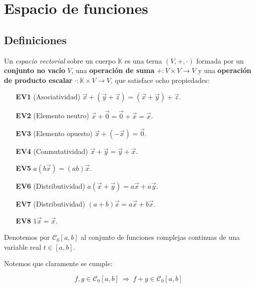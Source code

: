 \chapter{Espacio de funciones}

\section{Definiciones}

\begin{defi}
    Un \emph{espacio vectorial} sobre un cuerpo $\mathbb{K}$ es una terna $(V, +, \cdot)$ formada por un \textbf{conjunto no vacío} $V$, una \textbf{operación de suma} $+: V \times V \to V$ y una \textbf{operación de producto escalar} $\cdot: \mathbb{K} \times V \to V$, que satisface ocho propiedades: 

    \begin{multicols}{2}   
        \begin{itemize}
            \item[\textbf{EV1}] (Asociatividad) $\vec{x} + (\vec{y} + \vec{z}) = (\vec{x} + \vec{y}) + \vec{z}$. 
            \item[\textbf{EV2}] (Elemento neutro) $\vec{x} + \vec{0} = \vec{0} + \vec{x} = \vec{x}$.
            \item[\textbf{EV3}] (Elemento opuesto) $\vec{x} + (-\vec{x}) = \vec{0}$.
            \item[\textbf{EV4}] (Conmutatividad) $\vec{x} + \vec{y} = \vec{y} + \vec{x}$. 
            \item[\textbf{EV5}] $a(b\vec{x}) = (ab) \vec{x}$.
            \item[\textbf{EV6}] (Distributividad) $a(\vec{x} + \vec{y}) = a \vec{x} + a\vec{y}$.
            \item[\textbf{EV7}] (Distributividad) $(a+b) \vec{x} = a\vec{x} + b\vec{x}$.
            \item[\textbf{EV8}] $1\vec{x} = \vec{x}$.    
        \end{itemize}
    \end{multicols}
\end{defi}

Denotemos por $\mathscr{C}_0 [a,b]$ al conjunto de funciones complejas continuas de una variable real $t \in [a,b]$.

Notemos que claramente se cumple:
\begin{shaded}
$$f,g \in \mathscr{C}_0[a,b] ~\Rightarrow~ f + g \in \mathscr{C}_0 [a,b]$$
\end{shaded}

